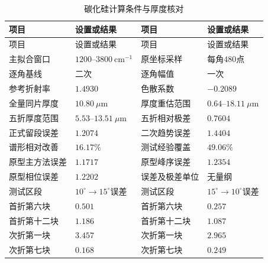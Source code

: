 \begingroup
\small
\begin{longtable}{>{\centering\arraybackslash}p{}>{\centering\arraybackslash}p{}>{\centering\arraybackslash}p{}>{\centering\arraybackslash}p{}}
\caption{碳化硅计算条件与厚度核对}\label{tab:q2-results}\\
\toprule
项目 & 设置或结果 & 项目 & 设置或结果\\
\midrule
\endfirsthead
\toprule
项目 & 设置或结果 & 项目 & 设置或结果\\
\midrule
\endhead
主拟合窗口 & $1200$--$3800\ \mathrm{cm}^{-1}$ & 原坐标采样 & 每角$480$点\\
逐角基线 & 二次 & 逐角幅值 & 一次\\
参考折射率 & $1.4930$ & 色散系数 & $-0.2089$\\
全量同片厚度 & $10.80\ \mu\mathrm{m}$ & 厚度重估范围 & $0.64$--$18.11\ \mu\mathrm{m}$\\
五折厚度范围 & $5.53$--$13.51\ \mu\mathrm{m}$ & 五折相对极差 & $0.7604$\\
正式留段误差 & $1.2074$ & 二次趋势误差 & $1.4404$\\
谱形相对改善 & $16.17\%$ & 测试经验覆盖 & $49.06\%$\\
原型主方法误差 & $1.1717$ & 原型峰序误差 & $1.2354$\\
原型相位误差 & $1.2202$ & 误差及极差单位 & 无量纲\\
\midrule
测试区段 & $10^\circ\!\to15^\circ$误差 & 测试区段 & $15^\circ\!\to10^\circ$误差\\
首折第六块 & $0.501$ & 首折第六块 & $0.257$\\
首折第十二块 & $1.186$ & 首折第十二块 & $1.087$\\
次折第一块 & $3.457$ & 次折第一块 & $2.965$\\
次折第七块 & $0.168$ & 次折第七块 & $0.249$\\
\bottomrule
\end{longtable}
\endgroup

